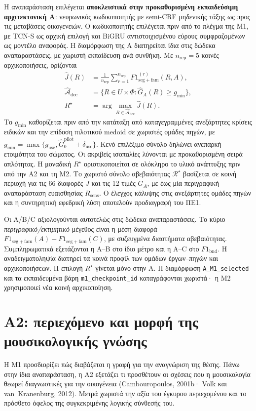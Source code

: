 \documentclass[a4paper]{article}
\newcommand{\Rs}{\ensuremath{R^{\star}}}
\begin{document}
Η αναπαράσταση επιλέγεται \textbf{αποκλειστικά στην προκαθορισμένη εκπαιδεύσιμη αρχιτεκτονική A}: νευρωνικός κωδικοποιητής με semi-CRF μηδενικής τάξης ως προς τις μεταβάσεις οικογενειών. Ο κωδικοποιητής επιλέγεται πριν από το πλέγμα της Μ1, με TCN-S ως αρχική επιλογή και BiGRU αντιστοιχισμένου εύρους συμφραζομένων ως μοντέλο αναφοράς. Η διαμόρφωση της A διατηρείται ίδια στις δώδεκα αναπαραστάσεις, με χωριστή εκπαίδευση ανά συνθήκη. Με $n_{\mathrm{rep}}=5$ κοινές αρχικοποιήσεις, ορίζονται
\[
\begin{aligned}
\widehat J(R)&=\frac{1}{n_{\mathrm{rep}}}\sum_{r=1}^{n_{\mathrm{rep}}}F1_{\mathrm{seg+fam}}^{(r)}(R,A),\\
\widehat{\mathcal A}_{\mathrm{dec}}&=\{R\in U\times\Phi:\widehat G_A(R)\ge g_{\min}\},\\
\Rs&=\arg\max_{R\in\widehat{\mathcal A}_{\mathrm{dec}}}\widehat J(R).
\end{aligned}
\]
Το $g_{\min}$ καθορίζεται πριν από την κατάταξη από καταγεγραμμένες ανεξάρτητες κρίσεις ειδικών και την επίδοση πιλοτικού medoid σε χωριστές ομάδες πηγών, με $g_{\min}=\max\{g_{\mathrm{use}},\widehat G_0^{\mathrm{pilot}}+\delta_{\mathrm{use}}\}$. Κενό επιλέξιμο σύνολο δηλώνει ανεπαρκή ετοιμότητα του σώματος. Οι ακριβείς ισοπαλίες λύνονται με προκαθορισμένη σειρά απλότητας. Η μοναδική $\Rs$ οριστικοποιείται σε ολόκληρο το υλικό ανάπτυξης πριν από την Α2 και τη Μ2. Το χωριστό σύνολο αβεβαιότητας $\mathcal R^\star$ βασίζεται σε κοινή περιοχή για τις 66 διαφορές $J$ και τις 12 τιμές $G_A$, με έως μία περιγραφική αναπαράσταση ευαισθησίας $R_{\mathrm{sens}}$. Ο έλεγχος κάλυψης στις ανεξάρτητες ομάδες πηγών και η συντηρητική εφεδρική λύση αποτελούν προδιαγραφή του ΠΕ1.

Οι A/B/C αξιολογούνται αυτοτελώς στις δώδεκα αναπαραστάσεις. Το κύριο \emph{περιγραφικό/εκτιμητικό} μέγεθος είναι η μέση διαφορά $F1_{\mathrm{seg+fam}}(A)-F1_{\mathrm{seg+fam}}(C)$, με συζευγμένα διαστήματα αβεβαιότητας. Συμπληρωματικά εξετάζονται η A--B στο ίδιο μέτρο και η A--C στο $F1_{\mathrm{bnd}}$. Η αναδειγματοληψία διατηρεί τα κοινά προφίλ των ομάδων έργων--πηγών και αρχικοποιήσεων. Η επιλογή $\Rs$ γίνεται μόνο στην A. Η διαμόρφωση \texttt{A\_M1\_selected} και τα εκπαιδευμένα βάρη \texttt{m1\_checkpoint\_id} καταγράφονται χωριστά· η Μ2 χρησιμοποιεί νέα κοινή αρχικοποίηση.

\section{Α2: περιεχόμενο και μορφή της μουσικολογικής γνώσης}\label{sec:a2}
Η Μ1 προσδιορίζει πώς διαβάζεται η γραφή για την αναγνώριση της θέσης. Πάνω στην ίδια αναπαράσταση, η Α2 εξετάζει τι προσθέτουν οι σχέσεις που η μουσικολογία θεωρεί διαγνωστικές για την οικογένεια (Cambouropoulos, 2001b· Volk και van~Kranenburg, 2012). Μετρά χωριστά την αξία του έγκυρου περιεχομένου και το πρόσθετο όφελος της συγκεκριμένης λογικής σύνθεσής του.
\end{document}
